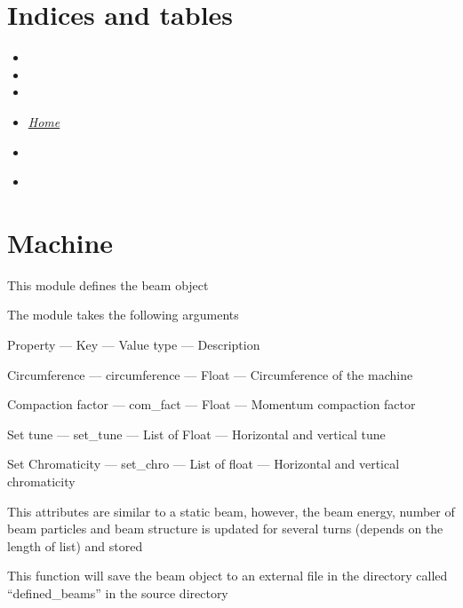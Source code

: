 \documentclass[letterpaper,10pt,english]{sphinxmanual}
\begin{document}
\section{Indices and tables}
\label{beam:indices-and-tables}\begin{itemize}
\item {} 

\item {} 

\item {} 

\item {} 
{\hyperref[index::doc]{\emph{\emph{Home}}}}

\item {} 
{\hyperref[index:index-label]{\emph{}}}

\item {} 
{\hyperref[beam:beam-label]{\emph{}}}

\end{itemize}


\section{Machine}
\label{machine:module-machine}\label{machine::doc}\label{machine:machine}
This module defines the beam object

The module takes the following arguments

Property --- Key --- Value type --- Description

Circumference --- circumference --- Float --- Circumference of the machine

Compaction factor --- com\_fact --- Float --- Momentum compaction factor

Set tune --- set\_tune --- List of Float --- Horizontal and vertical tune

Set Chromaticity --- set\_chro --- List of float --- Horizontal and vertical chromaticity

\begin{fulllineitems}
\label{machine:machine.dynamicmachine}
This attributes are similar to a static beam, however, the beam energy, number of beam particles and beam structure is updated for several turns (depends on the length of list) and stored

\begin{fulllineitems}
\label{machine:machine.dynamicmachine.save}
This function will save the beam object to an external file in the directory called ``defined\_beams'' in the source directory

\end{fulllineitems}


\end{fulllineitems}
\end{document}
